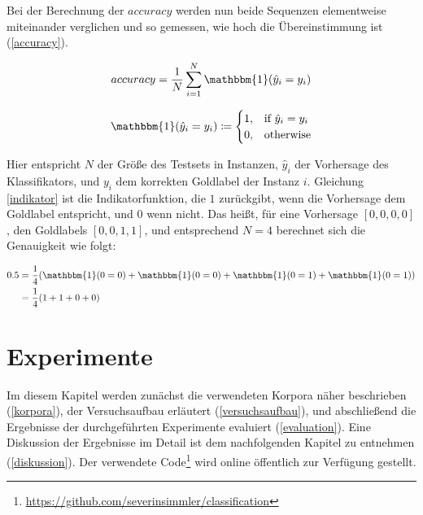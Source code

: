 Bei der Berechnung der $accuracy$ werden nun beide Sequenzen elementweise miteinander verglichen und so gemessen, wie hoch die Übereinstimmung ist (\ref{accuracy}).

\begin{equation}
\label{accuracy}
accuracy = \frac{1}{N} \sum\limits_{i=1}^{N} \mathbbm{1}(\hat{y}_{i} = y_{i})
\end{equation}


\begin{equation}
\label{indikator}
\mathbbm{1}(\hat{y}_{i} = y_{i}) \coloneqq 
\begin{cases}
      1, & \text{if}\ \hat{y}_{i} = y_{i} \\
      0, & \text{otherwise}
\end{cases}
\end{equation}

Hier entspricht $N$ der Größe des Testsets in Instanzen, $\hat{y}_{i}$ der Vorhersage des Klassifikators, und $y_{i}$ dem korrekten Goldlabel der Instanz $i$. Gleichung \ref{indikator} ist die Indikatorfunktion, die $1$ zurückgibt, wenn die Vorhersage dem Goldlabel entspricht, und $0$ wenn nicht. Das heißt, für eine Vorhersage $[0, 0, 0, 0]$, den Goldlabels $[0, 0, 1, 1]$, und entsprechend $N = 4$ berechnet sich die Genauigkeit wie folgt:


\begin{equation}
    \label{eq:eqn1}
        \begin{aligned}
            0.5 &= \frac{1}{4} (\mathbbm{1}(0 = 0) + \mathbbm{1}(0 = 0) + \mathbbm{1}(0 = 1) + \mathbbm{1}(0 = 1))                \\
                       &=\frac{1}{4} (1 + 1 + 0 + 0)                
        \end{aligned}
\end{equation}


\chapter{Experimente}
\label{experimente}

Im diesem Kapitel werden zunächst die verwendeten Korpora näher beschrieben (\ref{korpora}), der Versuchsaufbau erläutert (\ref{versuchsaufbau}), und abschließend die Ergebnisse der durchgeführten Experimente evaluiert (\ref{evaluation}). Eine Diskussion der Ergebnisse im Detail ist dem nachfolgenden Kapitel zu entnehmen (\ref{diskussion}). Der verwendete Code\footnote{\url{https://github.com/severinsimmler/classification}} wird online öffentlich zur Verfügung gestellt.


